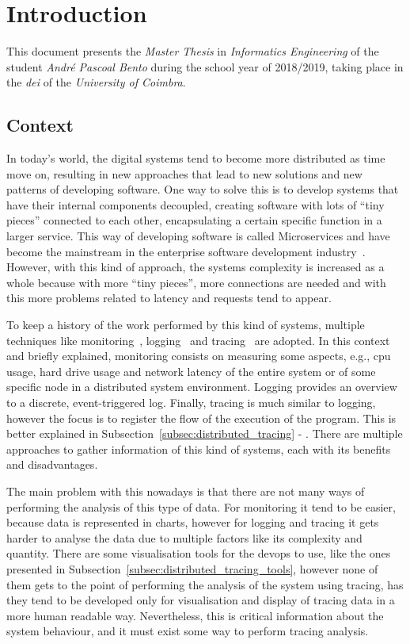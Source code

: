 \glsresetall
\chapter{Introduction}
\label{chap:introduction}

This document presents the \textit{Master Thesis} in \textit{Informatics Engineering} of the student \textit{André Pascoal Bento} during the school year of 2018/2019, taking place in the \textit{\gls{dei}} of the \textit{University of Coimbra}.

\section{Context}
\label{sec:context}

In today's world, the digital systems tend to become more distributed as time move on, resulting in new approaches that lead to new solutions and new patterns of developing software. One way to solve this is to develop systems that have their internal components decoupled, creating software with lots of ``tiny pieces'' connected to each other, encapsulating a certain specific function in a larger service. This way of developing software is called Microservices and have become the mainstream in the enterprise software development industry~\cite{microservices_growth}. However, with this kind of approach, the systems complexity is increased as a whole because with more ``tiny pieces'', more connections are needed and with this more problems related to latency and requests tend to appear.

To keep a history of the work performed by this kind of systems, multiple techniques like monitoring~\cite{monitoring}, logging~\cite{logging} and tracing~\cite{distributed_tracing} are adopted. In this context and briefly explained, monitoring consists on measuring some aspects, e.g., \gls{cpu} usage, hard drive usage and network latency of the entire system or of some specific node in a distributed system environment. Logging provides an overview to a discrete, event-triggered log. Finally, tracing is much similar to logging, however the focus is to register the flow of the execution of the program. This is better explained in Subsection~\ref{subsec:distributed_tracing} - . There are multiple approaches to gather information of this kind of systems, each with its benefits and disadvantages.

The main problem with this nowadays is that there are not many ways of performing the analysis of this type of data. For monitoring it tend to be easier, because data is represented in charts, however for logging and tracing it gets harder to analyse the data due to multiple factors like its complexity and quantity. There are some visualisation tools for the \gls{devops} to use, like the ones presented in Subsection~\ref{subsec:distributed_tracing_tools}, however none of them gets to the point of performing the analysis of the system using tracing, has they tend to be developed only for visualisation and display of tracing data in a more human readable way. Nevertheless, this is critical information about the system behaviour, and it must exist some way to perform tracing analysis.

